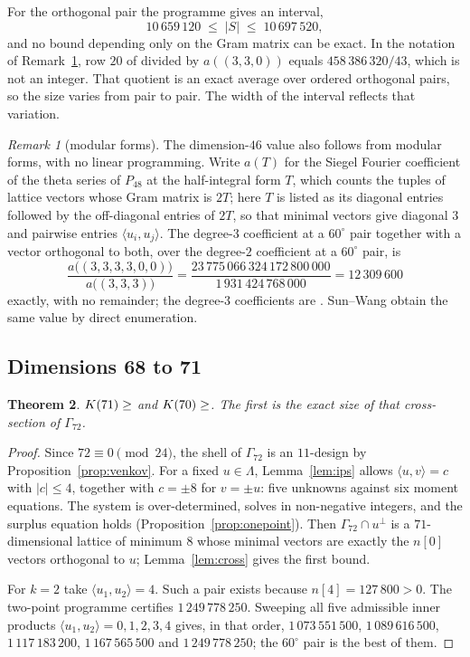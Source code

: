 \documentclass[11pt]{amsart}
\newtheorem{theorem}{Theorem}[section]
\theoremstyle{remark}
\newtheorem{remark}[theorem]{Remark}
\newcommand{\Pff}{P_{48}}
\newcommand{\Gsz}{\Gamma_{72}}
\newcommand{\ip}[2]{\langle #1,#2\rangle}
\begin{document}
For the orthogonal pair the programme gives an interval,
\[
  10\,659\,120 \;\le\; |S| \;\le\; 10\,697\,520,
\]
and no bound depending only on the Gram matrix can be exact. In the notation of
Remark~\ref{rem:ozeki}, row $20$ of \cite[Table 3]{ozeki2016} divided by
$a((3,3,0))$ equals $458\,386\,320/43$, which is not an integer. That quotient is
an exact average over ordered orthogonal pairs, so the size varies from pair to
pair. The width of the interval reflects that variation.

\begin{remark}[modular forms]\label{rem:ozeki}
The dimension-$46$ value also follows from modular forms, with no linear
programming. Write $a(T)$ for the Siegel Fourier coefficient of the theta series
of $\Pff$ at the half-integral form $T$, which counts the tuples of lattice
vectors whose Gram matrix is $2T$; here $T$ is listed as its diagonal entries
followed by the off-diagonal entries of $2T$, so that minimal vectors give
diagonal $3$ and pairwise entries $\ip{u_i}{u_j}$. The degree-$3$ coefficient at
a $60^\circ$ pair together with a vector orthogonal to both, over the degree-$2$
coefficient at a $60^\circ$ pair, is
\[
  \frac{a\bigl((3,3,3,3,0,0)\bigr)}{a\bigl((3,3,3)\bigr)}
  = \frac{23\,775\,066\,324\,172\,800\,000}{1\,931\,424\,768\,000}
  = 12\,309\,600
\]
exactly, with no remainder; the degree-$3$ coefficients are
\cite[Table 3]{ozeki2016}. Sun--Wang \cite{sun-wang2026} obtain the same value by
direct enumeration.
\end{remark}

\subsection{Dimensions 68 to 71}\label{ss:g72}

\begin{theorem}\label{thm:71}
$K(71)\ge\Kh{71}$ and $K(70)\ge\Kh{70}$. The first is the
exact size of that cross-section of $\Gsz$.
\end{theorem}

\begin{proof}
Since $72\equiv0\pmod{24}$, the shell of $\Gsz$ is an $11$-design by
Proposition~\ref{prop:venkov}. For a fixed $u\in\Lambda$, Lemma~\ref{lem:ips}
allows
$\ip{u}{v}=c$ with $|c|\le4$, together with $c=\pm8$ for $v=\pm u$: five
unknowns against six moment equations. The system is over-determined, solves in
non-negative integers, and the surplus equation holds
(Proposition~\ref{prop:onepoint}). Then $\Gsz\cap u^\perp$ is a
$71$-dimensional lattice of minimum $8$ whose minimal vectors are exactly the
$n[0]$ vectors orthogonal to $u$; Lemma~\ref{lem:cross} gives the first
bound.

For $k=2$ take $\ip{u_1}{u_2}=4$. Such a pair exists because $n[4]=127\,800>0$.
The two-point programme certifies $1\,249\,778\,250$. Sweeping all five admissible inner
products $\ip{u_1}{u_2}=0,1,2,3,4$ gives, in that order, $1\,073\,551\,500$,
$1\,089\,616\,500$, $1\,117\,183\,200$, $1\,167\,565\,500$ and
$1\,249\,778\,250$; the $60^\circ$ pair is the best of them.
\end{proof}
\end{document}
